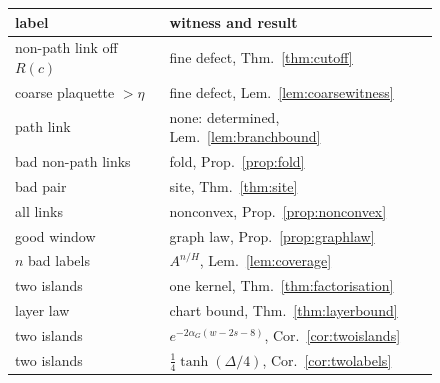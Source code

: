 \documentclass[11pt]{amsart}
\theoremstyle{definition}
\theoremstyle{remark}
\numberwithin{equation}{section}
\begin{document}
\begin{figure}[t]
\centering
\begin{minipage}[c]{0.46\textwidth}
\centering
{}
\end{minipage}\hfill
\begin{minipage}[c]{0.52\textwidth}
\centering\footnotesize
\begin{tabular}{@{}ll@{}}
\toprule
label & witness and result\\
\midrule
non-path link off $R(c)$ & fine defect, Thm.~\ref{thm:cutoff}\\
coarse plaquette $>\eta$ & fine defect, Lem.~\ref{lem:coarsewitness}\\
path link & none: determined, Lem.~\ref{lem:branchbound}\\
bad non-path links & fold, Prop.~\ref{prop:fold}\\
bad pair & site, Thm.~\ref{thm:site}\\
all links & nonconvex, Prop.~\ref{prop:nonconvex}\\
\midrule
good window & graph law, Prop.~\ref{prop:graphlaw}\\
$n$ bad labels & $A^{n/H}$, Lem.~\ref{lem:coverage}\\
two islands & one kernel, Thm.~\ref{thm:factorisation}\\
layer law & chart bound, Thm.~\ref{thm:layerbound}\\
two islands & $e^{-2\alpha_G(w-2s-8)}$, Cor.~\ref{cor:twoislands}\\
two islands & $\frac14\tanh(\varDelta/4)$, Cor.~\ref{cor:twolabels}\\

\end{tabular}
\end{minipage}
\end{figure}
\end{document}
